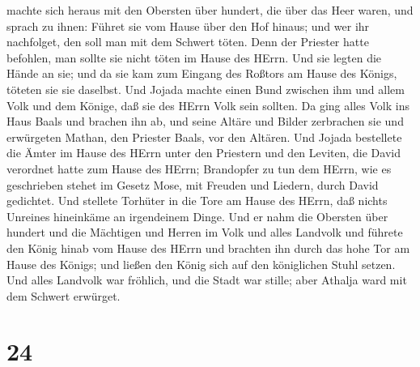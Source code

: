 machte sich heraus mit den Obersten über hundert, die über das Heer
waren, und sprach zu ihnen: Führet sie vom Hause über den Hof hinaus;
und wer ihr nachfolget, den soll man mit dem Schwert töten. Denn der
Priester hatte befohlen, man sollte sie nicht töten im Hause des HErrn.
 Und sie legten die Hände an sie; und da sie kam zum
Eingang des Roßtors am Hause des Königs, töteten sie sie daselbst.
 Und Jojada machte einen Bund zwischen ihm und allem Volk
und dem Könige, daß sie des HErrn Volk sein sollten.  Da
ging alles Volk ins Haus Baals und brachen ihn ab, und seine Altäre und
Bilder zerbrachen sie und erwürgeten Mathan, den Priester Baals, vor den
Altären.  Und Jojada bestellete die Ämter im Hause des
HErrn unter den Priestern und den Leviten, die David verordnet hatte zum
Hause des HErrn; Brandopfer zu tun dem HErrn, wie es geschrieben stehet
im Gesetz Mose, mit Freuden und Liedern, durch David gedichtet.
 Und stellete Torhüter in die Tore am Hause des HErrn, daß
nichts Unreines hineinkäme an irgendeinem Dinge.  Und er
nahm die Obersten über hundert und die Mächtigen und Herren im Volk und
alles Landvolk und führete den König hinab vom Hause des HErrn und
brachten ihn durch das hohe Tor am Hause des Königs; und ließen den
König sich auf den königlichen Stuhl setzen.  Und alles
Landvolk war fröhlich, und die Stadt war stille; aber Athalja ward mit
dem Schwert erwürget.

\hypertarget{section-23}{%
\section{24}\label{section-23}}

